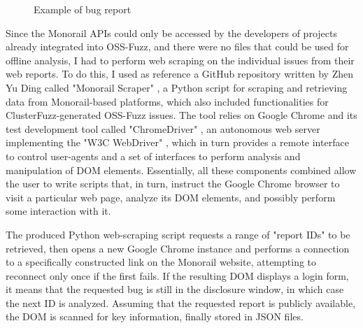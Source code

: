 \begin{figure}[h]
\caption{Example of bug report \cite{ossfuzz_bugtracker}}
\label{fig:issue}
\end{figure}

Since the Monorail APIs could only be accessed by the developers of projects already integrated into OSS-Fuzz, and there were no files that could be used for offline analysis, I had to perform web scraping on the individual issues from their web reports. To do this, I used as reference a GitHub repository written by Zhen Yu Ding called "Monorail Scraper" \cite{scraper}, a Python script for scraping and retrieving data from Monorail-based platforms, which also included functionalities for ClusterFuzz-generated OSS-Fuzz issues. The tool relies on Google Chrome and its test development tool called "ChromeDriver" \cite{driver}, an autonomous web server implementing the "W3C WebDriver" \cite{driver_standard}, which in turn provides a remote interface to control user-agents and a set of interfaces to perform analysis and manipulation of DOM elements. Essentially, all these components combined allow the user to write scripts that, in turn, instruct the Google Chrome browser to visit a particular web page, analyze its DOM elements, and possibly perform some interaction with it.


\newpage
The produced Python web-scraping script requests a range of "report IDs" to be retrieved, then opens a new Google Chrome instance and performs a connection to a specifically constructed link on the Monorail website, attempting to reconnect only once if the first fails. If the resulting DOM displays a login form, it means that the requested bug is still in the disclosure window, in which case the next ID is analyzed. Assuming that the requested report is publicly available, the DOM is scanned for key information, finally stored in JSON files. 
\newline

